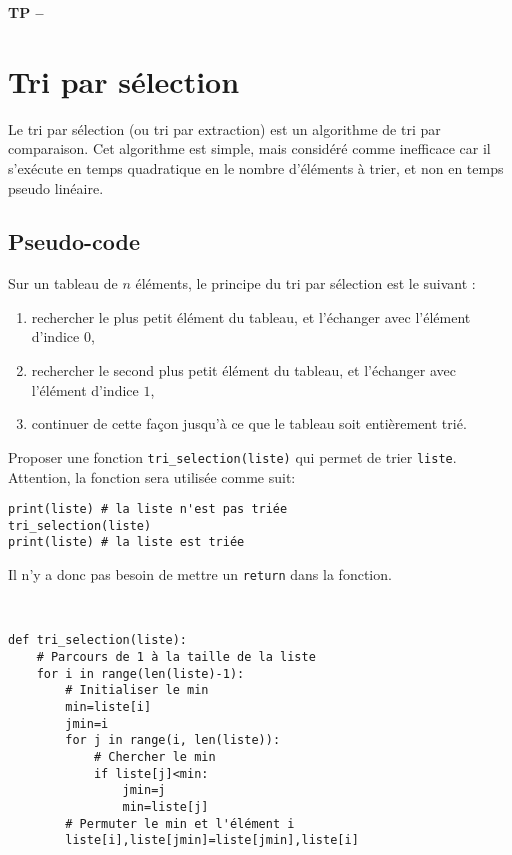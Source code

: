 

%





\begin{center}
{\Large\bf TP \no {\numero} -- \descrip}
\end{center}


\section{Tri par sélection}

Le tri par sélection (ou tri par extraction) est un algorithme de tri par comparaison. Cet algorithme est simple, mais considéré comme inefficace car il s'exécute en temps quadratique en le nombre d'éléments à trier, et non en temps pseudo linéaire. 

\subsection{Pseudo-code}

Sur un tableau de $n$ éléments, le principe du tri par sélection est le suivant :
\begin{enumerate}
 \item rechercher le plus petit élément du tableau, et l'échanger avec l'élément d'indice $0$,
 \item rechercher le second plus petit élément du tableau, et l'échanger avec l'élément d'indice $1$,
 \item continuer de cette façon jusqu'à ce que le tableau soit entièrement trié.
\end{enumerate}

\begin{exercice}
Proposer une fonction \verb?tri_selection(liste)? qui permet de trier \verb?liste?. Attention, la fonction sera utilisée comme suit:
\begin{verbatim}
print(liste) # la liste n'est pas triée
tri_selection(liste)
print(liste) # la liste est triée
\end{verbatim}

Il n'y a donc pas besoin de mettre un \verb?return? dans la fonction.
\end{exercice}

\begin{solution}~\\
\vspace{-0.7cm}
\begin{verbatim}
def tri_selection(liste): 
    # Parcours de 1 à la taille de la liste
    for i in range(len(liste)-1):
        # Initialiser le min
        min=liste[i]
        jmin=i
        for j in range(i, len(liste)):
            # Chercher le min
            if liste[j]<min:
                jmin=j
                min=liste[j]
        # Permuter le min et l'élément i
        liste[i],liste[jmin]=liste[jmin],liste[i]	
\end{verbatim}    
\end{solution}

